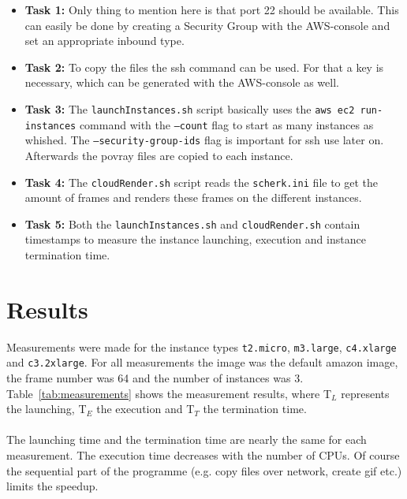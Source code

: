 \documentclass{article}
\begin{document}
\begin{itemize}

\item \textbf{Task 1:} Only thing to mention here is that port 22 should be available. This can easily be done by creating a Security Group with the AWS-console and set an appropriate inbound type.
\item \textbf{Task 2:} To copy the files the ssh command can be used. For that a key is necessary, which can be generated with the AWS-console as well.
\item \textbf{Task 3:} The \texttt{launchInstances.sh} script basically uses the \texttt{aws ec2 run-instances} command with the \texttt{--count} flag to start as many instances as whished. The \texttt{--security-group-ids} flag is important for ssh use later on. Afterwards the povray files are copied to each instance.
\item \textbf{Task 4:} The \texttt{cloudRender.sh} script reads the \texttt{scherk.ini} file to get the amount of frames and renders these frames on the different instances.
\item \textbf{Task 5:} Both the \texttt{launchInstances.sh} and \texttt{cloudRender.sh} contain timestamps to measure the instance launching, execution and instance termination time.
\end{itemize}



\section{Results}

Measurements were made for the instance types \texttt{t2.micro}, \texttt{m3.large}, \texttt{c4.xlarge} and \texttt{c3.2xlarge}. For all measurements the image was the default amazon image, the frame number was 64 and the number of instances was 3. Table~\ref{tab:measurements} shows the measurement results, where T$_{L}$ represents the launching, T$_{E}$ the execution and T$_{T}$ the termination time.
\\
\\
The launching time and the termination time are nearly the same for each measurement. The execution time decreases with the number of CPUs. Of course the sequential part of the programme (e.g. copy files over network, create gif etc.) limits the speedup.
\end{document}

